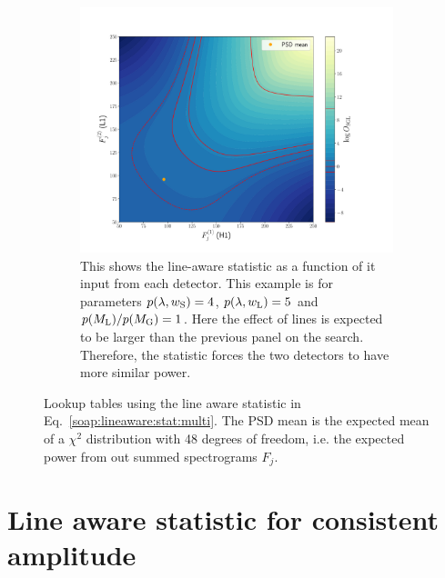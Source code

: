 \begin{figure}
\begin{subfigure}[h]{\linewidth}
\begin{minipage}{0.65\linewidth}
\includegraphics[width=0.9\columnwidth]{C3_soap/lookup_linebig.pdf}
\end{minipage}\hfill
\begin{minipage}{0.35\linewidth}
\caption{This shows the line-aware statistic as a function of it input from each detector. This example is for parameters $p(\lambda,w_{\rm{S}}) = 4$, $p(\lambda,w_{\rm{L}}) = 5$ and $p(M_{\rm{L}})/p(M_{\rm{G}}) = 1$. Here the effect of lines is expected to be larger than the previous panel on the search. Therefore, the statistic forces the two detectors to have more similar power.}
\label{soap:las:detp:linebig}
\end{minipage}
\end{subfigure}
\caption[Lookup table for line aware statistic.]{Lookup tables using the line aware statistic in Eq.~\ref{soap:lineaware:stat:multi}. The \gls{PSD} mean is the expected mean of a $\chi^2$ distribution with 48 degrees of freedom, i.e. the expected power from out summed spectrograms $F_j$.}
\label{soap:las:osgl_plots}
\end{figure}


\section{\label{soap:lineawareamp}Line aware statistic for consistent amplitude}


